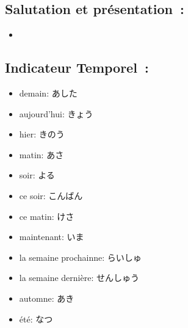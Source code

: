 \documentclass{article}
\begin{document}
\begin{CJK}{UTF8}{min}
   \subsection{Salutation et présentation~:}
   \begin{itemize}
       \item  
   \end{itemize}
    \subsection{Indicateur Temporel~:}
    \begin{itemize}
       \item demain: あした
        \item aujourd'hui: きょう
        \item hier: きのう
        \item matin: あさ
        \item soir: よる
        \item ce soir: こんばん
        \item ce matin: けさ
        \item maintenant: いま
        \item la semaine prochainne: らいしゅ
        \item la semaine dernière: せんしゅう
        \item automne: あき
        \item été: なつ
   \end{itemize}

\end{CJK}
\end{document}
